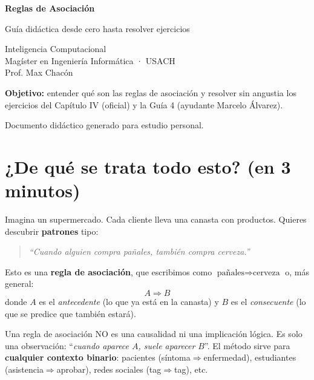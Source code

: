 \documentclass[11pt,a4paper]{article}
\begin{document}
\begin{titlepage}
\centering
\vspace*{2cm}
{\Huge\bfseries\color{usachdark} Reglas de Asociación\par}
\vspace{0.5cm}
{\Large Guía didáctica desde cero hasta resolver ejercicios\par}
\vspace{1.5cm}
{\large Inteligencia Computacional\\Magíster en Ingeniería Informática · USACH\\Prof. Max Chacón\par}
\vspace{2cm}
\begin{tcolorbox}[colback=usachteal!10,colframe=usachteal!70!black,width=0.85\textwidth]
\centering
\textbf{Objetivo:} entender qué son las reglas de asociación y resolver
sin angustia los ejercicios del Capítulo IV (oficial) y la Guía 4 (ayudante Marcelo Álvarez).
\end{tcolorbox}
\vfill
{\small Documento didáctico generado para estudio personal.\par}
\end{titlepage}

\tableofcontents
\newpage

\section{¿De qué se trata todo esto? (en 3 minutos)}

Imagina un supermercado. Cada cliente lleva una canasta con productos. Quieres descubrir
\textbf{patrones} tipo:

\begin{quote}
\emph{``Cuando alguien compra pañales, también compra cerveza.''}
\end{quote}

Esto es una \textbf{regla de asociación}, que escribimos como
$\text{pañales} \Rightarrow \text{cerveza}$ o, más general:
\[
A \Rightarrow B
\]
donde $A$ es el \emph{antecedente} (lo que ya está en la canasta) y $B$ es el
\emph{consecuente} (lo que se predice que también estará).

\begin{intuicionbox}
Una regla de asociación NO es una causalidad ni una implicación lógica.
Es solo una observación: ``\emph{cuando aparece $A$, suele aparecer $B$}''.
El método sirve para \textbf{cualquier contexto binario}: pacientes (síntoma$\Rightarrow$enfermedad),
estudiantes (asistencia$\Rightarrow$aprobar), redes sociales (tag$\Rightarrow$tag), etc.
\end{intuicionbox}
\end{document}
